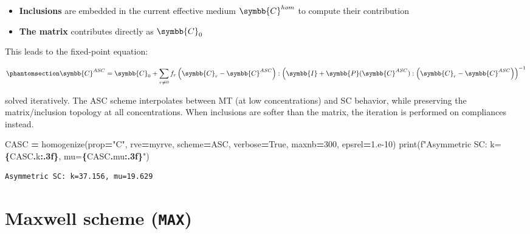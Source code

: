 \documentclass[
  a4paper,
  numbers=noendperiod,
  DIV=12]{scrreprt}
\newenvironment{Shaded}{\begin{snugshade}}{\end{snugshade}}
\newcommand{\BuiltInTok}[1]{#1}
\newcommand{\DecValTok}[1]{\textcolor[rgb]{0.00,0.00,0.81}{#1}}
\newcommand{\FloatTok}[1]{\textcolor[rgb]{0.00,0.00,0.81}{#1}}
\newcommand{\NormalTok}[1]{#1}
\newcommand{\OperatorTok}[1]{\textcolor[rgb]{0.81,0.36,0.00}{\textbf{#1}}}
\newcommand{\SpecialCharTok}[1]{\textcolor[rgb]{0.81,0.36,0.00}{\textbf{#1}}}
\newcommand{\SpecialStringTok}[1]{\textcolor[rgb]{0.31,0.60,0.02}{#1}}
\newcommand{\StringTok}[1]{\textcolor[rgb]{0.31,0.60,0.02}{#1}}
\newcommand{\VariableTok}[1]{\textcolor[rgb]{0.00,0.00,0.00}{#1}}
\providecommand{\tightlist}{%
  \setlength{\itemsep}{0pt}\setlength{\parskip}{0pt}}
\newcommand{\uuuu}[1]{{\symbb{{#1}}}}
\begin{document}
\begin{itemize}
\tightlist
\item
  \textbf{Inclusions} are embedded in the current effective medium
  \(\uuuu{C}^{hom}\) to compute their contribution
\item
  \textbf{The matrix} contributes directly as \(\uuuu{C}_0\)
\end{itemize}

This leads to the fixed-point equation:

\begin{equation}\protect\phantomsection\label{eq-C-asc}{
\uuuu{C}^{ASC} = \uuuu{C}_0 + \sum_{r \neq 0} f_r \left(\uuuu{C}_r - \uuuu{C}^{ASC}\right) : \left(\uuuu{I} + \uuuu{P}(\uuuu{C}^{ASC}) : \left(\uuuu{C}_r - \uuuu{C}^{ASC}\right)\right)^{-1}
}\end{equation}

solved iteratively. The ASC scheme interpolates between MT (at low
concentrations) and SC behavior, while preserving the matrix/inclusion
topology at all concentrations. When inclusions are softer than the
matrix, the iteration is performed on compliances instead.

\begin{Shaded}
\begin{Highlighting}[]
\NormalTok{CASC }\OperatorTok{=}\NormalTok{ homogenize(prop}\OperatorTok{=}\StringTok{"C"}\NormalTok{, rve}\OperatorTok{=}\NormalTok{myrve, scheme}\OperatorTok{=}\NormalTok{ASC,}
\NormalTok{                  verbose}\OperatorTok{=}\VariableTok{True}\NormalTok{, maxnb}\OperatorTok{=}\DecValTok{300}\NormalTok{, epsrel}\OperatorTok{=}\FloatTok{1.e{-}10}\NormalTok{)}
\BuiltInTok{print}\NormalTok{(}\SpecialStringTok{f"Asymmetric SC: k=}\SpecialCharTok{\{}\NormalTok{CASC}\SpecialCharTok{.}\NormalTok{k}\SpecialCharTok{:.3f\}}\SpecialStringTok{, mu=}\SpecialCharTok{\{}\NormalTok{CASC}\SpecialCharTok{.}\NormalTok{mu}\SpecialCharTok{:.3f\}}\SpecialStringTok{"}\NormalTok{)}
\end{Highlighting}
\end{Shaded}

\begin{verbatim}
Asymmetric SC: k=37.156, mu=19.629
\end{verbatim}

\section{\texorpdfstring{Maxwell scheme
(\texttt{MAX})}{Maxwell scheme (MAX)}}\label{sec-MAX}
\end{document}
